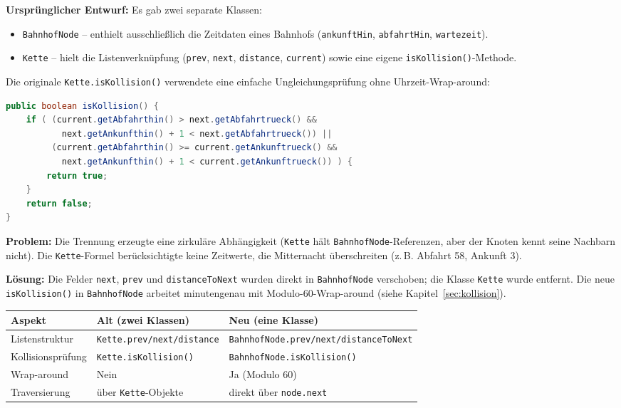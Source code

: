 \documentclass[12pt,a4paper]{article}
\begin{document}
\textbf{Ursprünglicher Entwurf:} Es gab zwei separate Klassen:

\begin{itemize}
  \item \texttt{BahnhofNode} – enthielt ausschließlich die Zeitdaten eines Bahnhofs
        (\texttt{ankunftHin}, \texttt{abfahrtHin}, \texttt{wartezeit}).
  \item \texttt{Kette} – hielt die Listenverknüpfung (\texttt{prev}, \texttt{next},
        \texttt{distance}, \texttt{current}) sowie eine eigene
        \texttt{isKollision()}-Methode.
\end{itemize}

Die originale \texttt{Kette.isKollision()} verwendete eine einfache
Ungleichungsprüfung ohne Uhrzeit-Wrap-around:

\begin{lstlisting}[language=Java, caption={Ursprüngliche \texttt{Kette.isKollision()} -- ohne Wrap-around}]
public boolean isKollision() {
    if ( (current.getAbfahrthin() > next.getAbfahrtrueck() &&
           next.getAnkunfthin() + 1 < next.getAbfahrtrueck()) ||
         (current.getAbfahrthin() >= current.getAnkunftrueck() &&
           next.getAnkunfthin() + 1 < current.getAnkunftrueck()) ) {
        return true;
    }
    return false;
}
\end{lstlisting}

\textbf{Problem:} Die Trennung erzeugte eine zirkuläre Abhängigkeit
(\texttt{Kette} hält \texttt{BahnhofNode}-Referenzen, aber der Knoten kennt seine
Nachbarn nicht). Die \texttt{Kette}-Formel berücksichtigte keine Zeitwerte, die
Mitternacht überschreiten (z.\,B. Abfahrt 58, Ankunft 3).

\textbf{Lösung:} Die Felder \texttt{next}, \texttt{prev} und \texttt{distanceToNext}
wurden direkt in \texttt{BahnhofNode} verschoben; die Klasse \texttt{Kette} wurde
entfernt. Die neue \texttt{isKollision()} in \texttt{BahnhofNode} arbeitet
minutengenau mit Modulo-60-Wrap-around (siehe Kapitel~\ref{sec:kollision}).

\begin{center}
\begin{tabular}{lll}
\toprule
\textbf{Aspekt}           & \textbf{Alt (zwei Klassen)}          & \textbf{Neu (eine Klasse)}            \\
\midrule
Listenstruktur            & \texttt{Kette.prev/next/distance}    & \texttt{BahnhofNode.prev/next/distanceToNext} \\
Kollisionsprüfung         & \texttt{Kette.isKollision()}         & \texttt{BahnhofNode.isKollision()}    \\
Wrap-around               & Nein                                 & Ja (Modulo 60)                        \\
Traversierung             & über \texttt{Kette}-Objekte          & direkt über \texttt{node.next}        \\
\bottomrule
\end{tabular}
\end{center}
\end{document}
